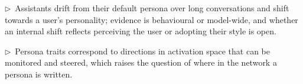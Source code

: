\documentclass[11pt]{article}
\newcommand{\flow}[1]{\par\noindent\textcolor{blue!60!black}{\small$\triangleright$\ #1}\par\medskip}
\begin{document}
\flow{Assistants drift from their default persona over long conversations and shift towards a user's personality; evidence is behavioural or model-wide, and whether an internal shift reflects perceiving the user or adopting their style is open.}

\flow{Persona traits correspond to directions in activation space that can be monitored and steered, which raises the question of where in the network a persona is written.}
\end{document}

